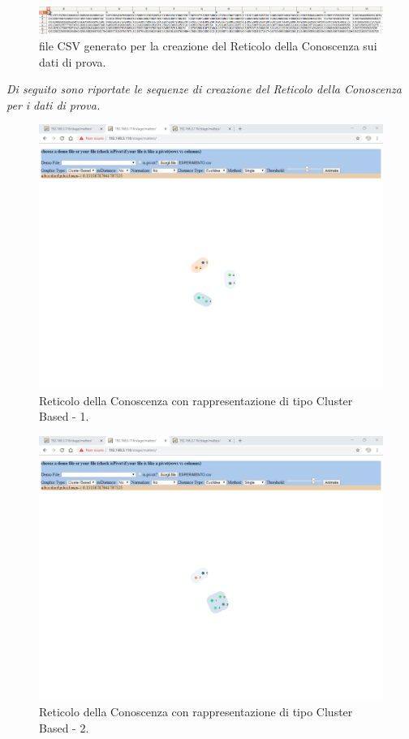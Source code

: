 \noindent
\begin{figure}[H]
\centering
	\includegraphics[width=1\linewidth]{./image/fileCSV_rete-prova.png}
	\caption{file CSV generato per la creazione del Reticolo della Conoscenza sui dati di prova.}
	\label{file CSV generato per la creazione del Reticolo della Conoscenza sui dati di prova.}
\end{figure}
\noindent
\textit{Di seguito sono riportate le sequenze di creazione del Reticolo della Conoscenza per i dati di prova.}
\noindent
\begin{figure}[H]
\centering
	\includegraphics[width=1\linewidth]{./image/reticoloCorretto1.png}
	\caption{Reticolo della Conoscenza con rappresentazione di tipo Cluster Based - 1.}
	\label{Reticolo della Conoscenza con rappresentazione di tipo Cluster Based - 1.}
\end{figure}
\noindent
\begin{figure}[H]
\centering
	\includegraphics[width=1\linewidth]{./image/reticoloCorretto2.png}
	\caption{Reticolo della Conoscenza con rappresentazione di tipo Cluster Based - 2.}
	\label{Reticolo della Conoscenza con rappresentazione di tipo Cluster Based - 2.}
\end{figure}
